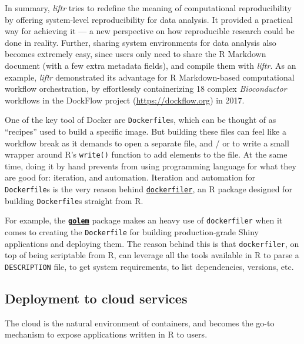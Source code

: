 In summary, \emph{liftr} tries to redefine the meaning of computational
reproducibility by offering system-level reproducibility for data
analysis. It provided a practical way for achieving it --- a new
perspective on how reproducible research could be done in reality.
Further, sharing system environments for data analysis also becomes
extremely easy, since users only need to share the R Markdown document
(with a few extra metadata fields), and compile them with \emph{liftr}.
As an example, \emph{liftr} demonstrated its advantage for R
Markdown-based computational workflow orchestration, by effortlessly
containerizing 18 complex \emph{Bioconductor} workflows in the DockFlow
project (\url{https://dockflow.org}) in 2017.

One of the key tool of Docker are \texttt{Dockerfile}s, which can be
thought of as ``recipes'' used to build a specific image. But building
these files can feel like a workflow break as it demands to open a
separate file, and / or to write a small wrapper around R's
\texttt{write()} function to add elements to the file. At the same time,
doing it by hand prevents from using programming language for what they
are good for: iteration, and automation. Iteration and automation for
\texttt{Dockerfile}s is the very reason behind
\href{https://github.com/ColinFay/dockerfiler}{\texttt{dockerfiler}}, an
R package designed for building \texttt{Dockerfile}s straight from R.

For example, the
\textbf{\href{https://github.com/ThinkR-open/golem}{\texttt{golem}}}
package makes an heavy use of \texttt{dockerfiler} when it comes to
creating the \texttt{Dockerfile} for building production-grade Shiny
applications and deploying them. The reason behind this is that
\texttt{dockerfiler}, on top of being scriptable from R, can leverage
all the tools available in R to parse a \texttt{DESCRIPTION} file, to
get system requirements, to list dependencies, versions, etc.

\hypertarget{deployment-to-cloud-services}{%
\subsection{Deployment to cloud
services}\label{deployment-to-cloud-services}}

The cloud is the natural environment of containers, and becomes the
go-to mechanism to expose applications written in R to users.

